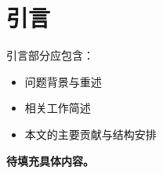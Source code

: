 \section{引言}
\label{sec:introduction}

引言部分应包含：
\begin{itemize}
    \item 问题背景与重述
    \item 相关工作简述
    \item 本文的主要贡献与结构安排
\end{itemize}

\textbf{待填充具体内容。}
